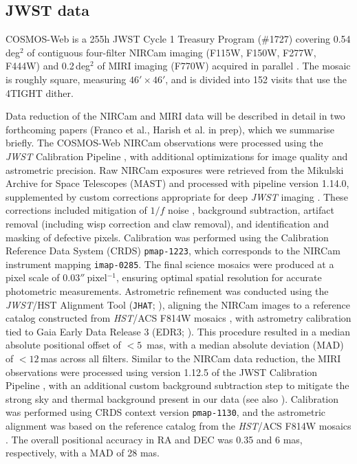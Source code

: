 \documentclass[longauth]{aa}
\begin{document}
\subsection{JWST data} \label{subsec:cweb}
COSMOS-Web is a 255h JWST Cycle 1 Treasury Program (\#1727) covering 0.54\,deg$^2$ of contiguous four-filter NIRCam imaging (F115W, F150W, F277W, F444W) and 0.2\,deg$^2$ of MIRI imaging (F770W) acquired in parallel \citep{Casey2023CW}. The mosaic is roughly square, measuring $\ang{;46}\times \ang{;46}$, and is divided into 152 visits that use the 4TIGHT dither. 

Data reduction of the NIRCam and MIRI data will be described in detail in two forthcoming papers (Franco et al., Harish et al. in prep), which we summarise briefly. The COSMOS-Web NIRCam observations were processed using the \textit{JWST} Calibration Pipeline \citep{jwstcalibrationpipeline2023}, with additional optimizations for image quality and astrometric precision. Raw NIRCam exposures were retrieved from the Mikulski Archive for Space Telescopes (MAST) and processed with pipeline version 1.14.0, supplemented by custom corrections appropriate for deep  \textit{JWST} imaging \citep[e.g.,][]{Bagley2024}. These corrections included mitigation of $1/f$ noise \citep{Schlawin2020}, background subtraction, artifact removal (including wisp correction and claw removal), and identification and masking of defective pixels. Calibration was performed using the Calibration Reference Data System (CRDS) \texttt{pmap-1223}, which corresponds to the NIRCam instrument mapping \texttt{imap-0285}. The final science mosaics were produced at a pixel scale of $\ang{;;0.03}~\textrm{pixel}{^{-1}}$, ensuring optimal spatial resolution for accurate photometric measurements.
Astrometric refinement was conducted using the \textit{JWST}/HST Alignment Tool (\texttt{JHAT}; \citealt{Rest2023}), aligning the NIRCam images to a reference catalog constructed from \textit{HST}/ACS F814W mosaics \citep{Koekemoer2007}, with astrometry calibration tied to Gaia Early Data Release 3 (EDR3; \citealt{GaiaDR3}). This procedure resulted in a median absolute positional offset of $<5$\, mas, with a median absolute deviation (MAD) of $<12$\,mas across all filters. Similar to the NIRCam data reduction, the MIRI observations were processed using version 1.12.5 of the JWST Calibration Pipeline \citep{jwstcalibrationpipeline2023}, with an additional custom background subtraction step to mitigate the strong sky and thermal background present in our data (see also \citealt{Yang2023b,Perez-Gonzalez2024b}). Calibration was performed using CRDS context version \texttt{pmap-1130}, and the astrometric alignment was based on the reference catalog from the \textit{HST}/ACS F814W mosaics \citep{Koekemoer2007}. The overall positional accuracy in RA and DEC was 0.35 and 6 mas, respectively, with a MAD of 28 mas.
\end{document}
